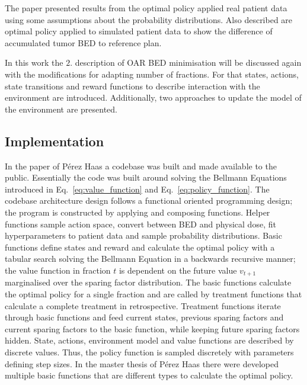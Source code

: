 \documentclass[\relativeRoot/ada.tex]{subfiles}
\begin{document}
The paper presented results from the optimal policy applied real patient data using some assumptions about the probability distributions. Also described are optimal policy applied to simulated patient data to show the difference of accumulated tumor BED to reference plan.

In this work the $2.$ description of OAR BED minimisation will be discussed again with the modifications for adapting number of fractions. For that states, actions, state transitions and reward functions to describe interaction with the environment are introduced. Additionally, two approaches to update the model of the environment are presented.


\subsection{Implementation}

In the paper of Pérez Haas \cite{perezhaas_adaptive} a codebase was built and made available to the public.  Essentially the code was built around solving the Bellmann Equations introduced in Eq.~\ref{eq:value_function} and Eq.~\ref{eq:policy_function}. The codebase architecture design follows a functional oriented programming design; the program is constructed by applying and composing functions. Helper functions sample action space, convert between BED and physical dose, fit hyperparameters to patient data and sample probability distributions. Basic functions define states and reward and calculate the optimal policy with a tabular search solving the Bellmann Equation in a backwards recursive manner; the value function  in fraction $t$ is dependent on the future value $v_{t+1}$ marginalised over the sparing factor distribution. The basic functions calculate the optimal policy for a single fraction and are called by treatment functions that calculate a complete treatment in retrospective. Treatment functions iterate through basic functions and feed current states, previous sparing factors and current sparing factors to the basic function, while keeping future sparing factors hidden. State, actions, environment model and value functions are described by discrete values. Thus, the policy function is sampled discretely with parameters defining step sizes. In the master thesis of Pérez Haas \cite{perezhaas_master} there were developed multiple basic functions that are different types to calculate the optimal policy.
\end{document}
